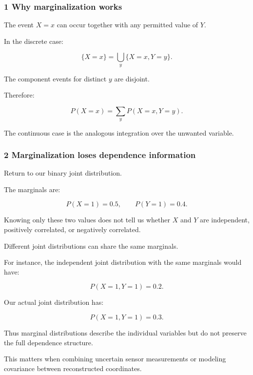 \subsubsection{1 Why marginalization works}\label{02-foundations-ii-ch023-why-marginalization-works}

\hypertarget{02-foundations-ii-ch023-why-marginalization-works}{}

The event \(X=x\) can occur together with any permitted value of \(Y\).

In the discrete case:

\[
 \{X=x\} = \bigcup_y\{X=x,Y=y\}.
\]

The component events for distinct \(y\) are disjoint.

Therefore:

\[
 P(X=x)=\sum_yP(X=x,Y=y).
\]

The continuous case is the analogous integration over the unwanted variable.

\subsubsection{2 Marginalization loses dependence information}\label{02-foundations-ii-ch023-marginalization-loses-dependence-information}

\hypertarget{02-foundations-ii-ch023-marginalization-loses-dependence-information}{}

Return to our binary joint distribution.

The marginals are:

\[
 P(X=1)=0.5, \qquad P(Y=1)=0.4.
\]

Knowing only these two values does not tell us whether \(X\) and \(Y\) are independent, positively correlated, or negatively correlated.

Different joint distributions can share the same marginals.

For instance, the independent joint distribution with the same marginals would have:

\[
 P(X=1,Y=1)=0.2.
\]

Our actual joint distribution has:

\[
 P(X=1,Y=1)=0.3.
\]

Thus marginal distributions describe the individual variables but do not preserve the full dependence structure.

This matters when combining uncertain sensor measurements or modeling covariance between reconstructed coordinates.


